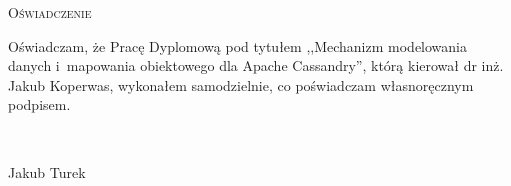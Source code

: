 \newpage
\thispagestyle{empty}


\begin{center}
 \LARGE\textsc{Oświadczenie}
\end{center}

\vspace{1cm}

Oświadczam, że Pracę Dyplomową pod tytułem ,,Mechanizm modelowania danych i~mapowania obiektowego dla Apache Cassandry'', którą kierował dr inż. Jakub Koperwas, wykonałem samodzielnie, co poświadczam własnoręcznym podpisem.

\vspace{2cm}

\begin{flushright}
\begin{minipage}{5cm}
 \dotfill \\[-0.7cm]
 \begin{center}
  \small Jakub Turek
 \end{center}
\end{minipage}
\end{flushright}

